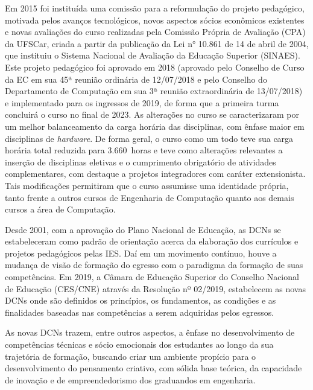 Em 2015 foi instituída uma comissão para a reformulação do projeto pedagógico, motivada pelos avanços tecnológicos, novos aspectos sócios econômicos existentes e novas avaliações do curso realizadas pela Comissão Própria de Avaliação (CPA) da UFSCar, criada a partir da publicação da Lei n° 10.861 de 14 de abril de 2004, que instituiu o Sistema Nacional de Avaliação da Educação Superior (SINAES). Este projeto pedagógico foi aprovado em 2018 (aprovado pelo Conselho de Curso da EC em sua 45ª reunião ordinária de 12/07/2018 e pelo Conselho do Departamento de Computação em sua 3ª reunião extraordinária de 13/07/2018) e implementado para os ingressos de 2019, de forma que a primeira turma concluirá o curso no final de 2023. As alterações no curso se caracterizaram por um melhor balanceamento da carga horária das disciplinas, com ênfase maior em disciplinas de \textit{hardware}. De forma geral, o curso como um todo teve sua carga horária total reduzida para 3.660~horas e teve como alterações relevantes a inserção de disciplinas eletivas e o cumprimento obrigatório de atividades complementares, com destaque a projetos integradores com caráter extensionista. Tais modificações permitiram que o curso assumisse uma identidade própria, tanto frente a outros cursos de Engenharia de Computação quanto aos demais cursos a área de Computação. 


Desde 2001, com a aprovação do Plano Nacional de Educação, as DCNs se estabeleceram como padrão de orientação acerca da elaboração dos currículos e projetos pedagógicos pelas IES. Daí em um movimento contínuo, houve a mudança de visão de formação do egresso com o paradigma da formação de suas competências. Em 2019, a Câmara de Educação Superior do Conselho Nacional de Educação (CES/CNE) através da Resolução nº 02/2019, estabelecem as novas DCNs onde são definidos os princípios, os fundamentos, as condições e as finalidades baseadas nas competências a serem adquiridas pelos egressos.  

As novas DCNs trazem, entre outros aspectos, a ênfase no desenvolvimento de competências técnicas e sócio emocionais dos estudantes ao longo da sua trajetória de formação, buscando criar um ambiente propício para o desenvolvimento do pensamento criativo, com sólida base teórica, da capacidade de inovação e de empreendedorismo dos graduandos em engenharia.

